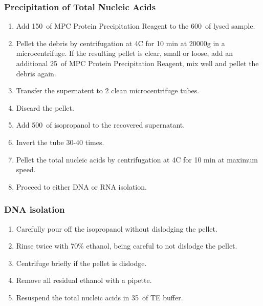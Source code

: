 \subsubsection{Precipitation of Total Nucleic Acids}

\begin{enumerate}
\item Add 150~\uL of MPC Protein Precipitation Reagent to the 600~\uL of lysed sample.
\item Pellet the debris by centrifugation at 4\degree C for 10 min at 20000g in a microcentrifuge. If the resulting pellet is clear, small or loose, add an additional 25~\uL of MPC Protein Precipitation Reagent, mix well and pellet the debris again.
\item Transfer the supernatent to 2 clean microcentrifuge tubes.
\item Discard the pellet.
\item Add 500~\uL of isopropanol to the recovered supernatant.
\item Invert the tube 30-40 times.
\item Pellet the total nucleic acids by centrifugation at 4\degree C for 10 min at maximum speed.
\item Proceed to either DNA or RNA isolation.
\end{enumerate}

\subsubsection{DNA isolation}

\begin{enumerate}
\item Carefully pour off the isopropanol without dislodging the pellet.
\item Rinse twice with 70\% ethanol, being careful to not dislodge the pellet.
\item Centrifuge briefly if the pellet is dislodge.
\item Remove all residual ethanol with a pipette.
\item Resuspend the total nucleic acids in 35~\uL of TE buffer.
\end{enumerate}

